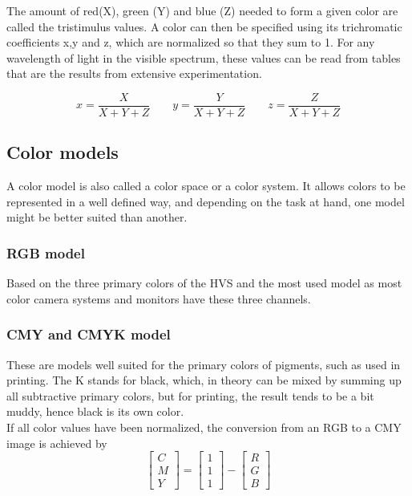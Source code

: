 The amount of red(X), green (Y) and blue (Z) needed to form a given color are called the tristimulus values.
A color can then be specified using its trichromatic coefficients x,y and z, which are normalized so that they sum to 1.
For any wavelength of light in the visible spectrum, these values can be read from tables that are the results from extensive experimentation.

\[
	x = \frac{X}{X+Y+Z} \qquad
	y = \frac{Y}{X+Y+Z} \qquad
	z = \frac{Z}{X+Y+Z}
\]



\subsection{Color models }
A color model is also called a color space or a color system. It allows colors to be represented in a well defined way, and depending on the task at hand, one model might be better suited than another.

\subsubsection{RGB model }
Based on the three primary colors of the HVS and the most used model as most color camera systems and monitors have these three channels.


\subsubsection{CMY and CMYK model }
These are models well suited for the primary colors of pigments, such as used in printing. The K stands for black, which, in theory can be mixed by summing up all subtractive primary colors, but for printing, the result tends to be a bit muddy, hence black is its own color. \\

If all color values have been normalized, the conversion from an RGB to a CMY image is achieved by
\begin{equation}
	\left[ \begin{array}{l} C \\ M \\ Y \end{array} \right] = \left[ \begin{array}{l} 1 \\ 1 \\ 1 \end{array} \right] - \left[ \begin{array}{l} R \\ G \\ B \end{array} \right]
\end{equation}

